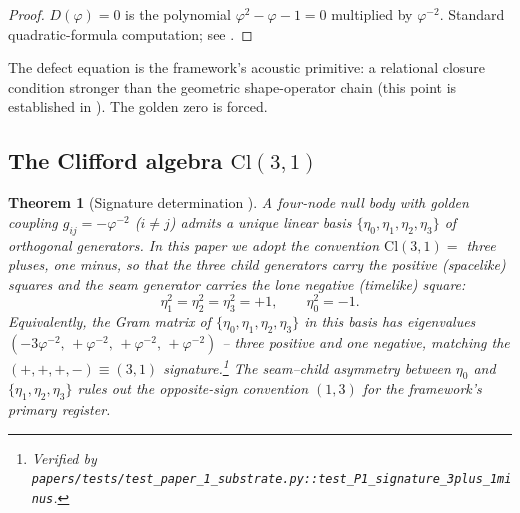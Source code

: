 \documentclass[11pt,a4paper]{article}
\theoremstyle{plain}
\newtheorem{theorem}{Theorem}[section]
\theoremstyle{definition}
\theoremstyle{remark}
\numberwithin{equation}{section}
\providecommand{\Cl}{\mathrm{Cl}}
\providecommand{\vp}{\varphi}
\begin{document}
\begin{proof}
$D(\vp) = 0$ is the polynomial $\vp^2 - \vp - 1 = 0$ multiplied by
$\vp^{-2}$.  Standard quadratic-formula computation; see
\cite[\S2]{golden-tetrad}.
\end{proof}

The defect equation is the framework's acoustic primitive: a
relational closure condition stronger than the geometric
shape-operator chain (this point is established in
\cite{acoustic-primacy}).  The golden zero is forced.

\subsection{The Clifford algebra \texorpdfstring{$\Cl(3,1)$}{Cl(3,1)}}

\begin{theorem}[Signature determination {\cite[\S3]{golden-tetrad}}]
\label{thm:signature}
A four-node null body with golden coupling $g_{ij} = -\vp^{-2}$
($i \ne j$) admits a unique linear basis
$\{\eta_0, \eta_1, \eta_2, \eta_3\}$ of orthogonal generators.  In
this paper we adopt the convention $\Cl(3,1) = $ \emph{three pluses,
one minus}, so that the three child generators carry the
\emph{positive} (spacelike) squares and the seam generator carries
the lone \emph{negative} (timelike) square:
\[
  \eta_1^2 = \eta_2^2 = \eta_3^2 = +1,\qquad \eta_0^2 = -1.
\]
Equivalently, the Gram matrix of $\{\eta_0,\eta_1,\eta_2,\eta_3\}$
in this basis has eigenvalues $(-3\vp^{-2},\, +\vp^{-2},\,
+\vp^{-2},\, +\vp^{-2})$ -- three positive and one negative,
matching the $(+,+,+,-) \equiv (3,1)$ signature.\footnote{Verified
by
\texttt{papers/tests/test\_paper\_1\_substrate.py::test\_P1\_signature\_3plus\_1minus}.}
The seam--child asymmetry between $\eta_0$ and
$\{\eta_1, \eta_2, \eta_3\}$ rules out the opposite-sign convention
$(1,3)$ for the framework's primary register.
\end{theorem}
\end{document}
